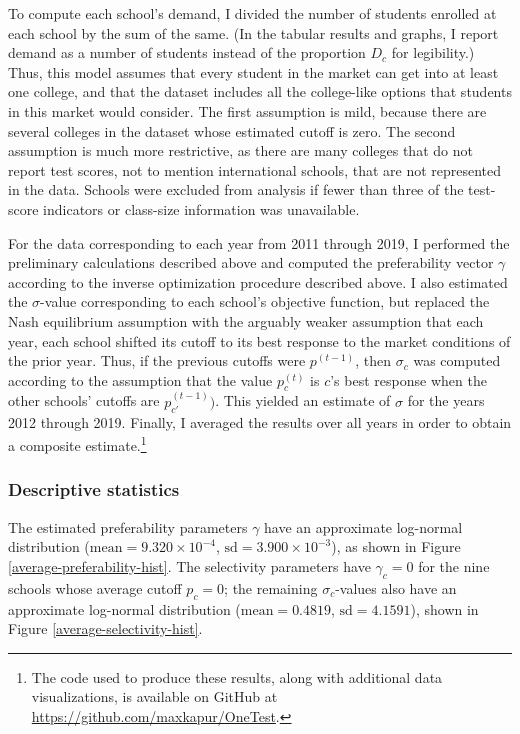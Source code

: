 \documentclass[12pt]{article}
\numberwithin{equation}{subsection}
\theoremstyle{definition}
\begin{document}
To compute each school's demand, I divided the number of students enrolled at each school by the sum of the same. (In the tabular results and graphs, I report demand as a number of students instead of the proportion $D_c$ for legibility.) Thus, this model assumes that every student in the market can get into at least one college, and that the dataset includes all the college-like options that students in this market would consider. The first assumption is mild, because there are several colleges in the dataset whose estimated cutoff is zero. The second assumption is much more restrictive, as there are many colleges that do not report test scores, not to mention international schools, that are not represented in the data. Schools were excluded from analysis if fewer than three of the test-score indicators or class-size information was unavailable. 

For the data corresponding to each year from 2011 through 2019, I performed the preliminary calculations described above and computed the preferability vector $\gamma$ according to the inverse optimization procedure described above. I also estimated the $\sigma$-value corresponding to each school's objective function, but replaced the Nash equilibrium assumption with the arguably weaker assumption that each year, each school shifted its cutoff to its best response to the market conditions of the prior year. Thus, if the previous cutoffs were $p^{(t-1)}$, then $\sigma_c$ was computed according to the assumption that the value $p_c^{(t)}$ is $c$'s best response when the other schools' cutoffs are $p_{c'}^{(t-1)})$. This yielded an estimate of $\sigma$ for the years 2012 through 2019. Finally, I averaged the results over all years in order to obtain a composite estimate.\footnote{The code used to produce these results, along with additional data visualizations, is available on GitHub at \url{https://github.com/maxkapur/OneTest}.}

\subsubsection{Descriptive statistics}
The estimated preferability parameters $\gamma$ have an approximate log-normal distribution ($\text{mean} = 9.320 \times 10^{-4}$, $\text{sd} = 3.900 \times 10^{-3}$), as shown in Figure \ref{average-preferability-hist}. The selectivity parameters have $\gamma_c = 0$ for the nine schools whose average cutoff $p_c = 0$; the remaining $\sigma_c$-values also have an approximate log-normal distribution ($\text{mean} = 0.4819$, $\text{sd} = 4.1591$), shown in Figure \ref{average-selectivity-hist}.
\end{document}
